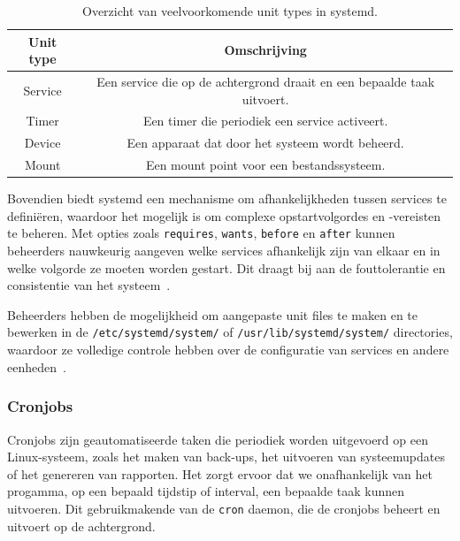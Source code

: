 \begin{table}[!h]
    \begin{center}
        \begin{tabular}{ c c }
            \hline
                Unit type & Omschrijving \\ [0.5ex] 
            \hline
                Service & Een service die op de achtergrond draait en een bepaalde taak uitvoert. \\
                Timer   & Een timer die periodiek een service activeert. \\
                Device  & Een apparaat dat door het systeem wordt beheerd. \\
                Mount   & Een mount point voor een bestandssysteem. \\
        \end{tabular}
    \end{center}
    \caption{Overzicht van veelvoorkomende unit types in systemd.}
    \label{table:sytemd_unit_types}
\end{table}

Bovendien biedt systemd een mechanisme om afhankelijkheden tussen services te definiëren, waardoor het mogelijk is om complexe opstartvolgordes en -vereisten te beheren.
Met opties zoals \texttt{requires}, \texttt{wants}, \texttt{before} en \texttt{after} kunnen beheerders nauwkeurig aangeven welke services afhankelijk zijn van elkaar en in welke volgorde ze moeten worden gestart.
Dit draagt bij aan de fouttolerantie en consistentie van het systeem~\autocite{ward2021linux}.

Beheerders hebben de mogelijkheid om aangepaste unit files te maken en te bewerken in de \texttt{/etc/systemd/system/} of \texttt{/usr/lib/systemd/system/} directories, waardoor ze volledige controle hebben over de configuratie van services en andere eenheden~\autocite{ward2021linux}.

\subsubsection{Cronjobs}
\label{linux_cronjobs}

Cronjobs zijn geautomatiseerde taken die periodiek worden uitgevoerd op een Linux-systeem, zoals het maken van back-ups, het uitvoeren van systeemupdates of het genereren van rapporten.
Het zorgt ervoor dat we onafhankelijk van het progamma, op een bepaald tijdstip of interval, een bepaalde taak kunnen uitvoeren.
Dit gebruikmakende van de \texttt{cron} daemon, die de cronjobs beheert en uitvoert op de achtergrond.

